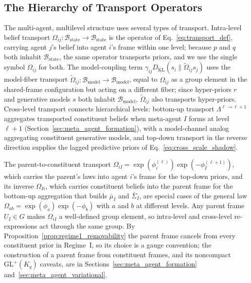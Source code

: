 \subsection{The Hierarchy of Transport Operators}
\label{sec:transport_hierarchy}

The multi-agent, multilevel structure uses several types of transport. Intra-level belief transport $\Omega_{ij}: \mathcal{B}_{\mathrm{state}} \to \mathcal{B}_{\mathrm{state}}$ is the operator of Eq.~\eqref{eq:transport_def}, carrying agent $j$'s belief into agent $i$'s frame within one level; because $p$ and $q$ both inhabit $\mathcal{B}_{\mathrm{state}}$, the same operator transports priors, and we use the single symbol $\Omega_{ij}$ for both. The model-coupling term $\gamma_{ij}D_{\mathrm{KL}}(s_i\|\tilde{\Omega}_{ij}s_j)$ uses the model-fiber transport $\tilde{\Omega}_{ij}: \mathcal{B}_{\mathrm{model}} \to \mathcal{B}_{\mathrm{model}}$, equal to $\Omega_{ij}$ as a group element in the shared-frame configuration but acting on a different fiber; since hyper-priors $r$ and generative models $s$ both inhabit $\mathcal{B}_{\mathrm{model}}$, $\tilde{\Omega}_{ij}$ also transports hyper-priors. Cross-level transport connects hierarchical levels: bottom-up transport $\Lambda^{\ell \to \ell+1}$ aggregates transported constituent beliefs when meta-agent $I$ forms at level $\ell+1$ (Section~\ref{sec:meta_agent_formation}), with a model-channel analog aggregating constituent generative models, and top-down transport in the reverse direction supplies the lagged predictive priors of Eq.~\eqref{eq:cross_scale_shadow}.

The parent-to-constituent transport $\Omega_{iI} = \exp(\phi_i^{(\ell)})\exp(-\phi_I^{(\ell+1)})$, which carries the parent's laws into agent $i$'s frame for the top-down priors, and its inverse $\Omega_{Ii}$, which carries constituent beliefs into the parent frame for the bottom-up aggregation that builds $\bar{\mu}_I$ and $\bar{\Sigma}_I$, are special cases of the general law $\Omega_{ab} = \exp(\phi_a)\exp(-\phi_b)$ with $a$ and $b$ at different levels. Any parent frame $U_I \in G$ makes $\Omega_{iI}$ a well-defined group element, so intra-level and cross-level re-expressions act through the same group. By Proposition~\ref{prop:regime1_removability} the parent frame cancels from every constituent prior in Regime~I, so its choice is a gauge convention; the construction of a parent frame from constituent frames, and its noncompact $\mathrm{GL}^+(K_q)$ caveats, are in Sections~\ref{sec:meta_agent_formation} and~\ref{sec:meta_agent_variational}.

